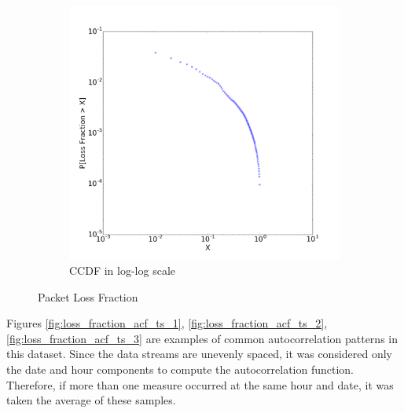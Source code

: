 \begin{figure}[H]
{\begin{subfigure}[b]{0.55\textwidth}
            \includegraphics[width=\linewidth]{./figures/dataset/ts/ccdf.png}
            \caption{CCDF in log-log scale}
        \end{subfigure}
    }
    \caption{Packet Loss Fraction}
    \label{fig:loss_fraction_cdf_ccdf}
\end{figure}%

Figures \ref{fig:loss_fraction_acf_ts_1}, \ref{fig:loss_fraction_acf_ts_2}, \ref{fig:loss_fraction_acf_ts_3} are examples of common autocorrelation patterns in this dataset. Since the data streams are unevenly spaced, it was considered only the date and hour components to compute the autocorrelation function. Therefore, if more than one measure occurred at the same hour and date, it was taken the average of these samples.

